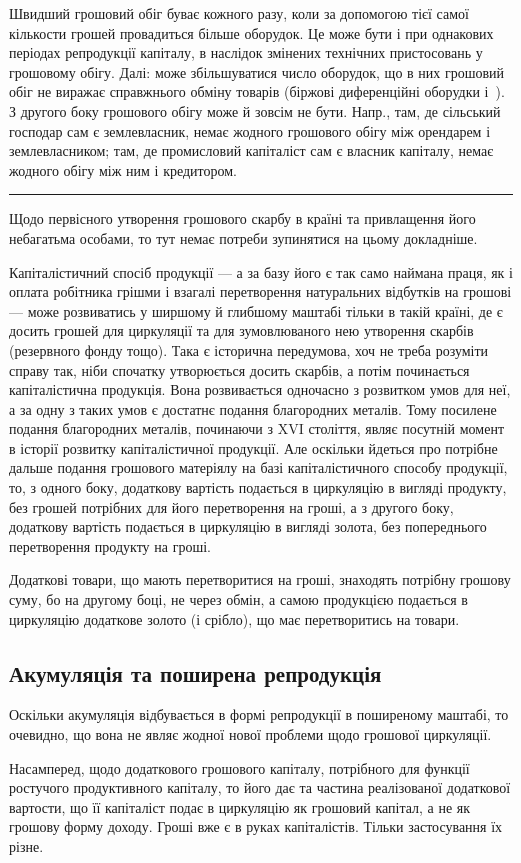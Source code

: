 
Швидший грошовий обіг буває кожного разу, коли за допомогою тієї
самої кількости грошей провадиться більше оборудок. Це може бути і
при однакових періодах репродукції капіталу, в наслідок змінених технічних
пристосовань у грошовому обігу. Далі: може збільшуватися число
оборудок, що в них грошовий обіг не виражає справжнього обміну товарів
(біржові диференційні оборудки і~). З другого боку грошового
обігу може й зовсім не бути. Напр., там, де сільський господар сам є
землевласник, немає жодного грошового обігу між орендарем і землевласником;
там, де промисловий капіталіст сам є власник капіталу, немає
жодного обігу між ним і кредитором.
\pfbreak
Щодо первісного утворення грошового скарбу в країні та привлащення
його небагатьма особами, то тут немає потреби зупинятися на
цьому докладніше.

Капіталістичний спосіб продукції — а за базу його є так само наймана
праця, як і оплата робітника грішми і взагалі перетворення натуральних
відбутків на грошові — може розвиватись у ширшому й глибшому маштабі
тільки в такій країні, де є досить грошей для циркуляції та для
зумовлюваного нею утворення скарбів (резервного фонду тощо). Така є
історична передумова, хоч не треба розуміти справу так, ніби спочатку
утворюється досить скарбів, а потім починається капіталістична продукція.
Вона розвивається одночасно з розвитком умов для неї, а за одну з
таких умов є достатнє подання благородних металів. Тому посилене подання
благородних металів, починаючи з XVI століття, являє посутній
момент в історії розвитку капіталістичної продукції. Але оскільки йдеться
про потрібне дальше подання грошового матеріялу на базі капіталістичного
способу продукції, то, з одного боку, додаткову вартість
подається в циркуляцію в вигляді продукту, без грошей потрібних для
його перетворення на гроші, а з другого боку, додаткову вартість подається
в циркуляцію в вигляді золота, без попереднього перетворення
продукту на гроші.

Додаткові товари, що мають перетворитися на гроші, знаходять потрібну
грошову суму, бо на другому боці, не через обмін, а самою продукцією
подається в циркуляцію додаткове золото (і срібло), що має
перетворитись на товари.

\subsection{Акумуляція та поширена репродукція}

Оскільки акумуляція відбувається в формі репродукції в поширеному
маштабі, то очевидно, що вона не являє жодної нової проблеми щодо грошової
циркуляції.

Насамперед, щодо додаткового грошового капіталу, потрібного для
функції ростучого продуктивного капіталу, то його дає та частина реалізованої
додаткової вартости, що її капіталіст подає в циркуляцію як грошовий
капітал, а не як грошову форму доходу. Гроші вже є в руках
капіталістів. Тільки застосування їх різне.
